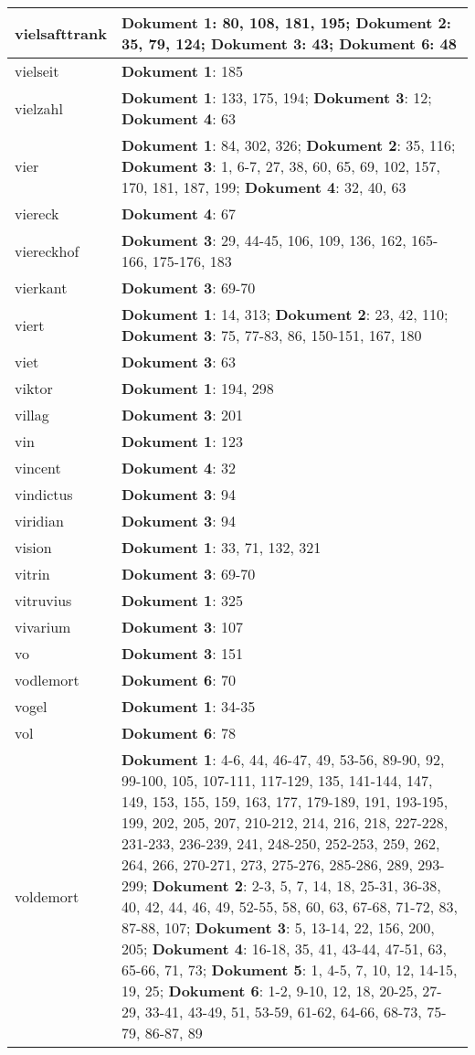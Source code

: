 \documentclass[a5paper]{article}
\begin{document}
\begin{longtable}[l]{|l|p{3in}|}
\hline
vielsafttrank & \textbf{Dokument 1}: 80, 108, 181, 195; \textbf{Dokument 2}: 35, 79, 124; \textbf{Dokument 3}: 43; \textbf{Dokument 6}: 48 \\
\hline
vielseit & \textbf{Dokument 1}: 185 \\
\hline
vielzahl & \textbf{Dokument 1}: 133, 175, 194; \textbf{Dokument 3}: 12; \textbf{Dokument 4}: 63 \\
\hline
vier & \textbf{Dokument 1}: 84, 302, 326; \textbf{Dokument 2}: 35, 116; \textbf{Dokument 3}: 1, 6-7, 27, 38, 60, 65, 69, 102, 157, 170, 181, 187, 199; \textbf{Dokument 4}: 32, 40, 63 \\
\hline
viereck & \textbf{Dokument 4}: 67 \\
\hline
viereckhof & \textbf{Dokument 3}: 29, 44-45, 106, 109, 136, 162, 165-166, 175-176, 183 \\
\hline
vierkant & \textbf{Dokument 3}: 69-70 \\
\hline
viert & \textbf{Dokument 1}: 14, 313; \textbf{Dokument 2}: 23, 42, 110; \textbf{Dokument 3}: 75, 77-83, 86, 150-151, 167, 180 \\
\hline
viet & \textbf{Dokument 3}: 63 \\
\hline
viktor & \textbf{Dokument 1}: 194, 298 \\
\hline
villag & \textbf{Dokument 3}: 201 \\
\hline
vin & \textbf{Dokument 1}: 123 \\
\hline
vincent & \textbf{Dokument 4}: 32 \\
\hline
vindictus & \textbf{Dokument 3}: 94 \\
\hline
viridian & \textbf{Dokument 3}: 94 \\
\hline
vision & \textbf{Dokument 1}: 33, 71, 132, 321 \\
\hline
vitrin & \textbf{Dokument 3}: 69-70 \\
\hline
vitruvius & \textbf{Dokument 1}: 325 \\
\hline
vivarium & \textbf{Dokument 3}: 107 \\
\hline
vo & \textbf{Dokument 3}: 151 \\
\hline
vodlemort & \textbf{Dokument 6}: 70 \\
\hline
vogel & \textbf{Dokument 1}: 34-35 \\
\hline
vol & \textbf{Dokument 6}: 78 \\
\hline
voldemort & \textbf{Dokument 1}: 4-6, 44, 46-47, 49, 53-56, 89-90, 92, 99-100, 105, 107-111, 117-129, 135, 141-144, 147, 149, 153, 155, 159, 163, 177, 179-189, 191, 193-195, 199, 202, 205, 207, 210-212, 214, 216, 218, 227-228, 231-233, 236-239, 241, 248-250, 252-253, 259, 262, 264, 266, 270-271, 273, 275-276, 285-286, 289, 293-299; \textbf{Dokument 2}: 2-3, 5, 7, 14, 18, 25-31, 36-38, 40, 42, 44, 46, 49, 52-55, 58, 60, 63, 67-68, 71-72, 83, 87-88, 107; \textbf{Dokument 3}: 5, 13-14, 22, 156, 200, 205; \textbf{Dokument 4}: 16-18, 35, 41, 43-44, 47-51, 63, 65-66, 71, 73; \textbf{Dokument 5}: 1, 4-5, 7, 10, 12, 14-15, 19, 25; \textbf{Dokument 6}: 1-2, 9-10, 12, 18, 20-25, 27-29, 33-41, 43-49, 51, 53-59, 61-62, 64-66, 68-73, 75-79, 86-87, 89 \\

\end{longtable}
\end{document}
